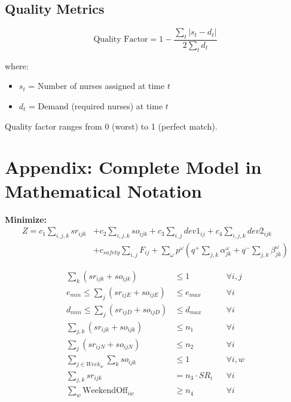 \documentclass[12pt,a4paper]{article}
\begin{document}
\subsection{Quality Metrics}

\begin{equation}
\text{Quality Factor} = 1 - \frac{\sum_t |s_t - d_t|}{2 \sum_t d_t}
\end{equation}

where:
\begin{itemize}
    \item $s_t$ = Number of nurses assigned at time $t$
    \item $d_t$ = Demand (required nurses) at time $t$
\end{itemize}

Quality factor ranges from 0 (worst) to 1 (perfect match).

\newpage

\section{Appendix: Complete Model in Mathematical Notation}

\begin{tcolorbox}[colback=blue!5!white, colframe=blue!75!black, title=I. Objective Function]
\textbf{Minimize:}
\begin{equation*}
\begin{split}
Z = c_1 \sum_{i,j,k} sr_{ijk} &+ c_2 \sum_{i,j,k} so_{ijk} + c_3 \sum_{i,j} dev1_{ij} + c_4 \sum_{i,j,k} dev2_{ijk} \\
& + c_{safety} \sum_{i,j} F_{ij} + \sum_\omega p^\omega \left( q^+ \sum_{j,k} \alpha_{jk}^\omega + q^- \sum_{j,k} \beta_{jk}^\omega \right)
\end{split}
\end{equation*}
\end{tcolorbox}

\begin{tcolorbox}[colback=gray!5!white, colframe=gray!75!black, title=II. Stage 1: Base Staffing \& Patterns]
\begin{align*}
\sum_k (sr_{ijk} + so_{ijk}) &\leq 1 && \forall i,j \tag{C1} \\
e_{min} \leq \sum_j (sr_{ijE} + so_{ijE}) &\leq e_{max} && \forall i \tag{C2-3} \\
d_{min} \leq \sum_j (sr_{ijD} + so_{ijD}) &\leq d_{max} && \forall i \tag{C4-5} \\
\sum_{j,k} (sr_{ijk} + so_{ijk}) &\leq n_1 && \forall i \tag{C6} \\
\sum_j (sr_{ijN} + so_{ijN}) &\leq n_2 && \forall i \tag{C7} \\
\sum_{j \in Week_w} \sum_k so_{ijk} &\leq 1 && \forall i, w \tag{C7.5} \\
\sum_{j,k} sr_{ijk} &= n_3 \cdot SR_i && \forall i \tag{C8} \\
\sum_w \text{WeekendOff}_{iw} &\geq n_4 && \forall i \tag{C9}
\end{align*}
\end{tcolorbox}
\end{document}
